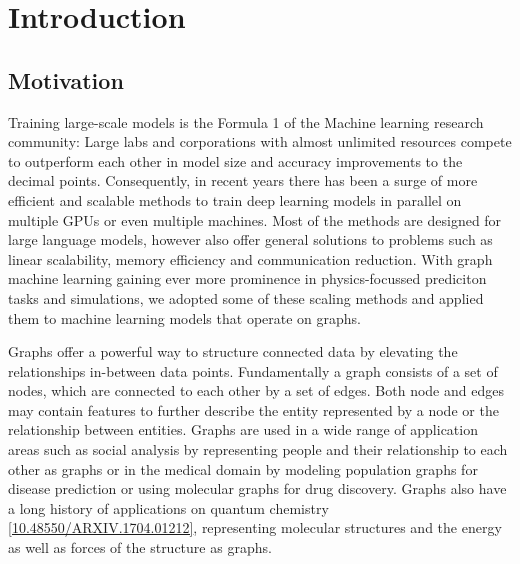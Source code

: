 \section{Introduction}

\subsection{Motivation}

Training large-scale models is the Formula 1 of the Machine learning research community: Large labs and corporations with 
almost unlimited resources compete to outperform each other in model size and accuracy improvements to the decimal points. 
Consequently, in recent years there has been a surge of more efficient and scalable methods to train deep learning models 
in parallel on multiple GPUs or even multiple machines. Most of the methods are designed for large language models, however 
also offer general solutions to problems such as linear scalability, memory efficiency and 
communication reduction. With graph machine learning gaining ever more prominence in physics-focussed prediciton tasks and 
simulations, we adopted some of these scaling methods and applied them to machine learning models that operate on graphs. 

Graphs offer a powerful way to structure connected data by elevating the relationships in-between data points. 
Fundamentally a graph consists of a set of nodes, which are connected to each other by a set of edges. Both node 
and edges may contain features to further describe the entity represented by a node or the relationship between entities.
Graphs are used in a wide range of application areas such as social analysis by representing people and their relationship 
to each other as graphs or in the medical domain by modeling population graphs for disease prediction or using molecular graphs 
for drug discovery. Graphs also have a long history of applications on quantum chemistry
\ref*{10.48550/ARXIV.1704.01212}, representing molecular 
structures and the energy as well as forces of the structure as graphs. 

